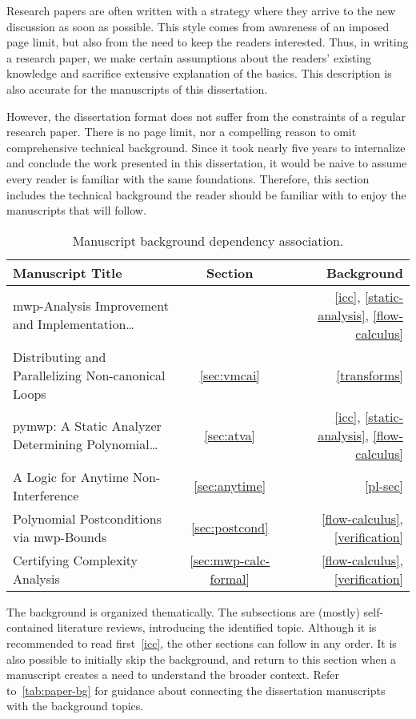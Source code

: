 
Research papers are often written with a strategy where they arrive to the new discussion as soon as possible.
This style comes from awareness of an imposed page limit, but also from the need to keep the readers interested.
Thus, in writing a research paper, we make certain assumptions about the readers' existing knowledge and sacrifice extensive explanation of the basics.
This description is also accurate for the manuscripts of this dissertation.

However, the dissertation format does not suffer from the constraints of a regular research paper.
There is no page limit, nor a compelling reason to omit comprehensive technical background.
Since it took nearly five years to internalize and conclude the work presented in this dissertation, it would be naive to assume every reader is familiar with the same foundations.
Therefore, this section includes the technical background the reader should be familiar with to enjoy the manuscripts that will follow.

\begin{table}[h!]
\begin{NiceTabularX}{\linewidth}{@{}Xcr@{}}
\toprule
\textbf{Manuscript Title} & \textbf{Section} & \textbf{Background} \\
\midrule
{mwp-Analysis Improvement and Implementation\ldots}
& 
& \ref{icc}, \ref{static-analysis}, \ref{flow-calculus} \\
{Distributing and Parallelizing Non-canonical Loops}
& \ref{sec:vmcai}
& \ref{transforms} \\
{pymwp: A Static Analyzer Determining Polynomial\ldots}
& \ref{sec:atva}
& \ref{icc}, \ref{static-analysis}, \ref{flow-calculus} \\
{A Logic for Anytime Non-Interference}
& \ref{sec:anytime}
& \ref{pl-sec} \\
{Polynomial Postconditions via mwp-Bounds}
& \ref{sec:postcond}
& \ref{flow-calculus}, \ref{verification} \\
{Certifying Complexity Analysis}
& \ref{sec:mwp-calc-formal}
& \ref{flow-calculus}, \ref{verification} \\
\bottomrule
\end{NiceTabularX}
\caption[Manuscript background dependency association]{Manuscript background dependency association.}
\label{tab:paper-bg}
\end{table}

The background is organized thematically.
The subsections are (mostly) self-contained literature reviews, introducing the identified topic.
Although it is recommended to read first~\autoref{icc}, the other sections can follow in any order.
It is also possible to initially skip the background, and return to this section when a manuscript creates a need to understand the broader context.
Refer to~\autoref{tab:paper-bg} for guidance about connecting the dissertation manuscripts with the background topics.
